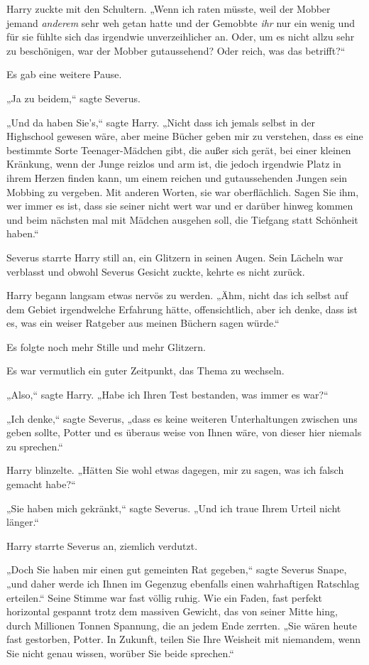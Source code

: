 {Harry zuckte mit den Schultern. „Wenn ich raten müsste, weil der Mobber jemand \emph{anderem} sehr weh getan hatte und der Gemobbte \emph{ihr} nur ein wenig und für sie fühlte sich das irgendwie unverzeihlicher an. Oder, um es nicht allzu sehr zu beschönigen, war der Mobber gutaussehend? Oder reich, was das betrifft?“

Es gab eine weitere Pause.

„Ja zu beidem,“ sagte Severus.

„Und da haben Sie's,“ sagte Harry. „Nicht dass ich jemals selbst in der Highschool gewesen wäre, aber meine Bücher geben mir zu verstehen, dass es eine bestimmte Sorte Teenager-Mädchen gibt, die außer sich gerät, bei einer kleinen Kränkung, wenn der Junge reizlos und arm ist, die jedoch irgendwie Platz in ihrem Herzen finden kann, um einem reichen und gutaussehenden Jungen sein Mobbing zu vergeben. Mit anderen Worten, sie war oberflächlich. Sagen Sie ihm, wer immer es ist, dass sie seiner nicht wert war und er darüber hinweg kommen und beim nächsten mal mit Mädchen ausgehen soll, die Tiefgang statt Schönheit haben.“

Severus starrte Harry still an, ein Glitzern in seinen Augen. Sein Lächeln war verblasst und obwohl Severus Gesicht zuckte, kehrte es nicht zurück.

Harry begann langsam etwas nervös zu werden. „Ähm, nicht das ich selbst auf dem Gebiet irgendwelche Erfahrung hätte, offensichtlich, aber ich denke, dass ist es, was ein weiser Ratgeber aus meinen Büchern sagen würde.“

Es folgte noch mehr Stille und mehr Glitzern.

Es war vermutlich ein guter Zeitpunkt, das Thema zu wechseln.

„Also,“ sagte Harry. „Habe ich Ihren Test bestanden, was immer es war?“

„Ich denke,“ sagte Severus, „dass es keine weiteren Unterhaltungen zwischen uns geben sollte, Potter und es überaus weise von Ihnen wäre, von dieser hier niemals zu sprechen.“

Harry blinzelte. „Hätten Sie wohl etwas dagegen, mir zu sagen, was ich falsch gemacht habe?“

„Sie haben mich gekränkt,“ sagte Severus. „Und ich traue Ihrem Urteil nicht länger.“

Harry starrte Severus an, ziemlich verdutzt.

„Doch Sie haben mir einen gut gemeinten Rat gegeben,“ sagte Severus Snape, „und daher werde ich Ihnen im Gegenzug ebenfalls einen wahrhaftigen Ratschlag erteilen.“ Seine Stimme war fast völlig ruhig. Wie ein Faden, fast perfekt horizontal gespannt trotz dem massiven Gewicht, das von seiner Mitte hing, durch Millionen Tonnen Spannung, die an jedem Ende zerrten. „Sie wären heute fast gestorben, Potter. In Zukunft, teilen Sie Ihre Weisheit mit niemandem, wenn Sie nicht genau wissen, worüber Sie beide sprechen.“

}

